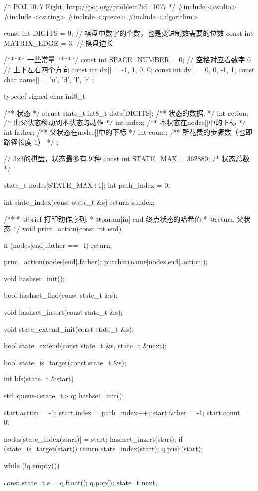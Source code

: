 \begin{Codex}[label=eight_digits_bfs2.c]
/* POJ 1077 Eight, http://poj.org/problem?id=1077 */
#include <cstdio>
#include <cstring>
#include <queue>
#include <algorithm>

const int DIGITS = 9; // 棋盘中数字的个数，也是变进制数需要的位数
const int MATRIX_EDGE = 3;       // 棋盘边长

/***** 一些常量 *****/
const int SPACE_NUMBER = 0; // 空格对应着数字 0
// 上下左右四个方向
const int dx[] = {-1, 1, 0, 0};
const int dy[] = {0, 0, -1, 1};
const char name[] = { 'u', 'd', 'l', 'r' };

typedef signed char int8_t;

/** 状态 */
struct state_t {
    int8_t data[DIGITS];  /** 状态的数据. */
    int action; /* 由父状态移动到本状态的动作 */
    int index;  /** 本状态在nodes[]中的下标 */
    int father; /** 父状态在nodes[]中的下标 */
    int count;  /** 所花费的步骤数（也即路径长度-1） */
};

// 3x3的棋盘，状态最多有 9!种
const int STATE_MAX = 362880;  /* 状态总数 */

state_t nodes[STATE_MAX+1];
int path_index = 0;

int state_index(const state_t &s) {
    return s.index;
}

/**
 * @brief 打印动作序列.
 * @param[in] end 终点状态的哈希值
 * @return 父状态
 */
void print_action(const int end) {
    if (nodes[end].father == -1) return;

    print_action(nodes[end].father);
    putchar(name[nodes[end].action]);
}

void hashset_init();

bool hashset_find(const state_t &s);

void hashset_insert(const state_t &s);

void state_extend_init(const state_t &s);

bool state_extend(const state_t &s, state_t &next);

bool state_is_target(const state_t &s);

int bfs(state_t &start) {
    std::queue<state_t> q;
    hashset_init();

    start.action = -1;
    start.index = path_index++;
    start.father = -1;
    start.count = 0;

    nodes[state_index(start)] = start;
    hashset_insert(start);
    if (state_is_target(start))
        return state_index(start);
    q.push(start);

    while (!q.empty()) {
        const state_t s = q.front(); q.pop();
        state_t next;

}}
\end{Codex}

